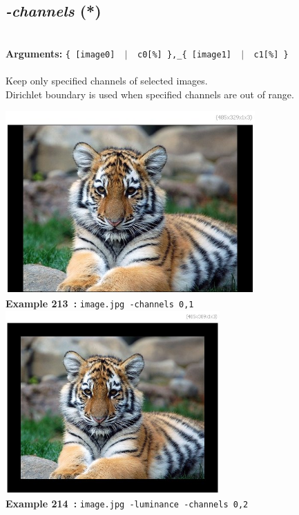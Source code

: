 \documentclass[a4paper,11pt,twoside]{book}
\begin{document}
\subsection{\emph{-channels} (*)}\vspace*{-0.5em}
~\\\textbf{Arguments: } 
{\small \texttt{\{ [image0] ~$|$~ c0[\%] \},\_\{ [image1] ~$|$~ c1[\%] \}}}\\~\\
Keep only specified channels of selected images.
~\\Dirichlet boundary is used when specified channels are out of range.
\begin{center}\includegraphics[keepaspectratio=true,height=7cm,width=\textwidth]{img/gmic_def213.jpg}\\
{\footnotesize \textbf{Example 213~:} \texttt{image.jpg -channels 0,1}}
\\\includegraphics[keepaspectratio=true,height=7cm,width=\textwidth]{img/gmic_def214.jpg}\\
{\footnotesize \textbf{Example 214~:} \texttt{image.jpg -luminance -channels 0,2}}
\end{center}
\end{document}
